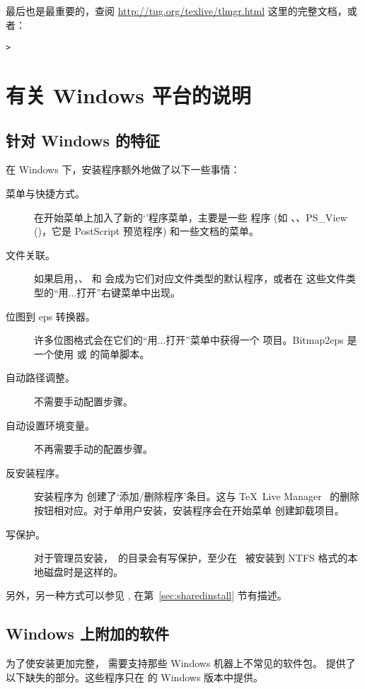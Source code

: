 \documentclass{article}
\begin{document}
最后也是最重要的，查阅 \url{http://tug.org/texlive/tlmgr.html}
这里的完整文档，或者：
\begin{alltt}
> 
\end{alltt}

\section{有关 Windows 平台的说明}
\label{sec:windows}

\subsection{针对 Windows 的特征}
\label{sec:winfeatures}

在 Windows 下，安装程序额外地做了以下一些事情：
\begin{description}
\item[菜单与快捷方式。] 在开始菜单上加入了新的`\TL{}'程序菜单，主要是一些
\GUI{} 程序 (如 、、PS\_View ()，它是
PostScript 预览程序) 和一些文档的菜单。
\item[文件关联。] 如果启用，、
和  会成为它们对应文件类型的默认程序，或者在
这些文件类型的“用...打开”右键菜单中出现。
\item[位图到 eps 转换器。] 许多位图格式会在它们的“用...打开”菜单中获得一个
   项目。Bitmap2eps 是一个使用  或
   的简单脚本。
\item[自动路径调整。] 不需要手动配置步骤。
\item[自动设置环境变量。] 不再需要手动的配置步骤。
\item[反安装程序。] 安装程序为 \TL{} 创建了`添加/删除程序'条目。这与
\TeX\ Live Manager \GUI\ 的删除按钮相对应。对于单用户安装，安装程序会在开始菜单
创建卸载项目。
\item[写保护。] 对于管理员安装，\TL\ 的目录会有写保护，至少在 \TL\ 被安装到 NTFS
格式的本地磁盘时是这样的。
\end{description}

另外，另一种方式可以参见 , 在第~\ref{sec:sharedinstall} 节有描述。

\subsection{Windows 上附加的软件}

为了使安装更加完整，\TL{} 需要支持那些 Windows 机器上不常见的软件包。
\TL{} 提供了以下缺失的部分。这些程序只在 \TL{} 的 Windows 版本中提供。
\end{document}
